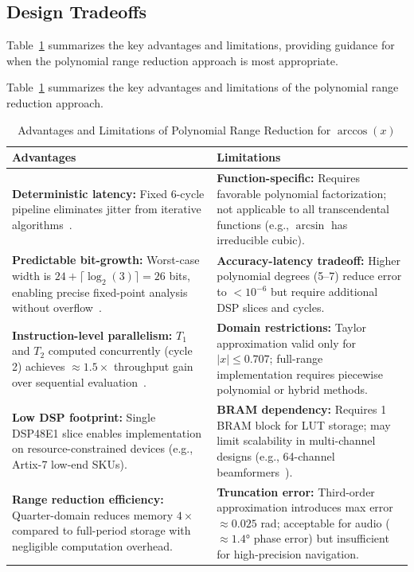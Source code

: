 \subsection{Design Tradeoffs}

Table~\ref{tab:arccos_tradeoffs} summarizes the key advantages and limitations, providing guidance for when the polynomial range reduction approach is most appropriate.

Table~\ref{tab:arccos_tradeoffs} summarizes the key advantages and limitations of the polynomial range reduction approach.

\begin{table}[htbp]
\centering
\caption{Advantages and Limitations of Polynomial Range Reduction for $\arccos(x)$}
\label{tab:arccos_tradeoffs}
\begin{tabular}{p{}p{}}
\hline
\textbf{Advantages} & \textbf{Limitations} \\
\hline
\textbf{Deterministic latency:} Fixed 6-cycle pipeline eliminates jitter from iterative algorithms~\cite{Volder1959,Andraka1998}. &
\textbf{Function-specific:} Requires favorable polynomial factorization; not applicable to all transcendental functions (e.g., $\arcsin$ has irreducible cubic).\\
\addlinespace
\textbf{Predictable bit-growth:} Worst-case width is $24 + \lceil\log_2(3)\rceil = 26$ bits, enabling precise fixed-point analysis without overflow~\cite{Muller2006}. &
\textbf{Accuracy-latency tradeoff:} Higher polynomial degrees (5–7) reduce error to $<10^{-6}$ but require additional DSP slices and cycles.\\
\addlinespace
\textbf{Instruction-level parallelism:} $T_1$ and $T_2$ computed concurrently (cycle 2) achieves $\approx1.5\times$ throughput gain over sequential evaluation~\cite{SinhaSrikanthan2014}. &
\textbf{Domain restrictions:} Taylor approximation valid only for $|x| \leq 0.707$; full-range implementation requires piecewise polynomial or hybrid methods.\\
\addlinespace
\textbf{Low DSP footprint:} Single DSP48E1 slice enables implementation on resource-constrained devices (e.g., Artix-7 low-end SKUs). &
\textbf{BRAM dependency:} Requires 1 BRAM block for LUT storage; may limit scalability in multi-channel designs (e.g., 64-channel beamformers~\cite{Silva2016}).\\
\addlinespace
\textbf{Range reduction efficiency:} Quarter-domain reduces memory $4\times$ compared to full-period storage with negligible computation overhead. &
\textbf{Truncation error:} Third-order approximation introduces max error $\approx 0.025$ rad; acceptable for audio ($\approx 1.4°$ phase error) but insufficient for high-precision navigation.\\
\hline
\end{tabular}
\end{table}
